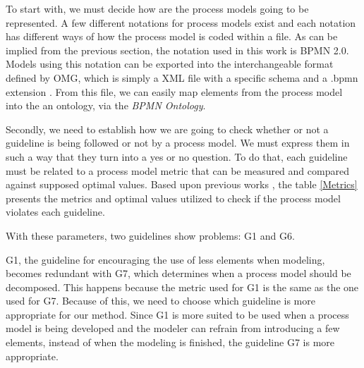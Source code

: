 \documentclass[a4paper,twoside]{article}
\begin{document}
To start with, we must decide how are the process models going to be represented. A few different notations for process models exist and each notation has different ways of how the process model is coded within a file. As can be implied from the previous section, the notation used in this work is BPMN 2.0. Models using this notation can be exported into the interchangeable format defined by OMG, which is simply a XML file with a specific schema and a .bpmn extension \cite{OMGObjectManagementGroup2015}. From this file, we can easily map elements from the process model into the an ontology, via the \textit{BPMN Ontology}.

Secondly, we need to establish how we are going to check whether or not a guideline is being followed or not by a process model. We must express them in such a way that they turn into a yes or no question. To do that,  each guideline must be related to a process model metric that can be measured and compared against supposed optimal values. Based upon previous works \cite{Mendling2008} \cite{Recker2011} \cite{Mendling:2012}, the table \ref{Metrics} presents the metrics and optimal values utilized to check if the process model violates each guideline.



With these parameters, two guidelines show problems: G1 and G6.


G1, the guideline for encouraging the use of less elements when modeling, becomes redundant with G7, which determines when a process model should be decomposed. This happens because the metric used for G1 is the same as the one used for G7. Because of this, we need to choose which guideline is more appropriate for our method. Since G1 is more suited to be used when a process model is being developed and the modeler can refrain from introducing a few elements, instead of when the modeling is finished, the guideline G7 is more appropriate.
\end{document}
